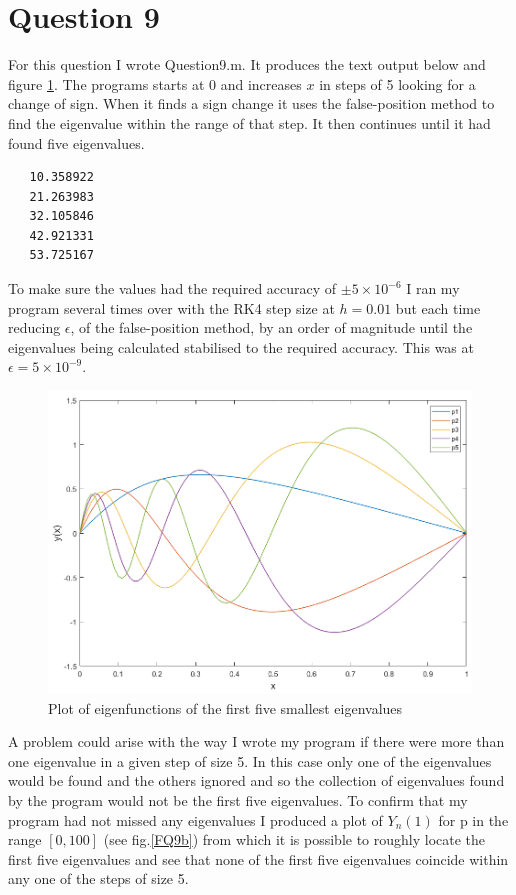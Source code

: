 \documentclass[a4paper]{article}
\begin{document}
\section*{Question 9}
For this question I wrote Question\textunderscore9.m. It produces the text output below and figure \ref{FQ9a}. The programs starts at 0 and increases $x$ in steps of 5 looking for a change of sign. When it finds a sign change it uses the false-position method to find the eigenvalue within the range of that step. It then continues until it had found five eigenvalues.

\begin{verbatim}
   10.358922 
   21.263983 
   32.105846 
   42.921331 
   53.725167
\end{verbatim}

To make sure the values had the required accuracy of $\pm5\times10^{-6}$ I ran my program several times over with the RK4 step size at $h=0.01$ but each time reducing $\epsilon$, of the false-position method, by an order of magnitude until the eigenvalues being calculated stabilised to the required accuracy. This was at $\epsilon=5\times10^{-9}$.

\begin{figure}[H]
\centering
\includegraphics[width=1\textwidth]{Q9_eigenfuncs5.png}
\caption{Plot of eigenfunctions of the first five smallest eigenvalues}
\label{FQ9a}
\end{figure}

A problem could arise with the way I wrote my program if there were more than one eigenvalue in a given step of size 5. In this case only one of the eigenvalues would be found and the others ignored and so the collection of eigenvalues found by the program would not be the first five eigenvalues. To confirm that my program had not missed any eigenvalues I produced a plot of $Y_n(1)$ for p in the range $[0,100]$ (see fig.\ref{FQ9b}) from which it is possible to roughly locate the first five eigenvalues and see that none of the first five eigenvalues coincide within any one of the steps of size 5.
\end{document}
